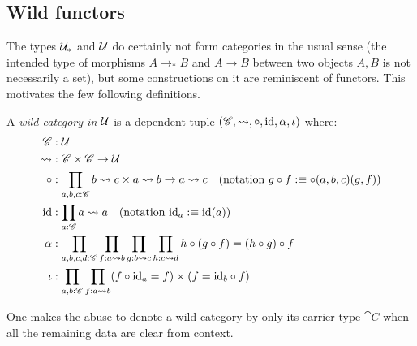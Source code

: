 \documentclass[english,a4]{article}
\renewcommand{\ap}[1]{\left[{#1}\right]}
\newcommand{\ptdto}{\to_\ast}%
\newcommand{\UUptd}{\UU_{\ast}}
\begin{document}

\subsection{Wild functors}
\label{sec:wild-functors}
\def\hom(#1,#2){#1 \rightsquigarrow #2}
%
The types $\UUptd$ and $\mathcal{U}$ do certainly not form categories in the usual
sense (the intended type of morphisms $A \ptdto B$ and $A\to B$ between two
objects $A,B$ is not necessarily a set), but some constructions on it are
reminiscent of functors. This motivates the few following definitions.

\begin{definition}
  A \emph{wild category in} $\mathcal{U}$ is a dependent tuple $(\cat C, \hom( , ), \circ, \id, \alpha,
  \iota)$ where:
  \begin{align*}
    \cat C&: \UU \\
    \hom( , )&: \cat C \times \cat C \to \UU \\
    \circ&: \prod_{a,b,c:\cat C} \hom(b,c) \times \hom(a,b) \to \hom(a,c) 
    \quad (\text{notation}\ g\circ f \defequi \circ(a,b,c)(g,f)) \\
    \id&: \prod_{a:\cat C} \hom(a,a) \quad (\text{notation}\ \id_a \defequi \id(a)) \\
    \alpha&: \prod_{a,b,c,d:\cat C} \prod_{f:\hom(a,b)} \prod_{g:\hom(b,c)} \prod_{h:\hom(c,d)}
    h\circ (g \circ f) = (h \circ g) \circ f \\
    \iota&: \prod_{a,b:\cat C} \prod_{f:\hom(a,b)} (f\circ \id_a = f) \times (f = \id_b \circ f)
  \end{align*}
  \label{defn:wild-cat}
\end{definition}
One makes the abuse to denote a wild category by only its carrier type $\cat C$ when
all the remaining data are clear from context.
\end{document}
